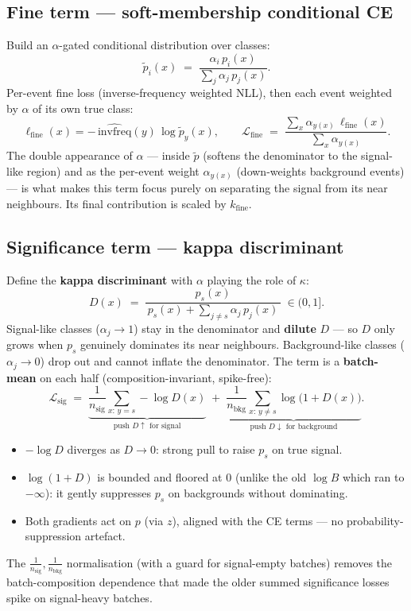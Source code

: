 \documentclass[11pt]{article}
\newcommand{\invfreq}{\widehat{\mathrm{invfreq}}}
\begin{document}
\subsection{Fine term --- soft-membership conditional CE}
Build an $\alpha$-gated conditional distribution over classes:
\begin{equation}
\tilde p_i(x) \;=\; \frac{\alpha_i \, p_i(x)}{\sum_j \alpha_j \, p_j(x)} .
\end{equation}
Per-event fine loss (inverse-frequency weighted NLL), then each event weighted by $\alpha$ of its
own true class:
\begin{equation}
\ell_\text{fine}(x) = -\,\invfreq(y)\,\log \tilde p_y(x),
\qquad
\mathcal{L}_\text{fine} \;=\; \frac{\sum_x \alpha_{y(x)}\,\ell_\text{fine}(x)}{\sum_x \alpha_{y(x)}} .
\end{equation}
The double appearance of $\alpha$ --- inside $\tilde p$ (softens the denominator to the
signal-like region) and as the per-event weight $\alpha_{y(x)}$ (down-weights background events)
--- is what makes this term focus purely on separating the signal from its near neighbours. Its
final contribution is scaled by $k_\text{fine}$.

\subsection{Significance term --- kappa discriminant}
Define the \textbf{kappa discriminant} with $\alpha$ playing the role of $\kappa$:
\begin{equation}
D(x) \;=\; \frac{p_s(x)}{\,p_s(x) + \displaystyle\sum_{j \ne s} \alpha_j \, p_j(x)\,} \;\in (0,1].
\end{equation}
Signal-like classes ($\alpha_j \to 1$) stay in the denominator and \textbf{dilute} $D$ --- so $D$
only grows when $p_s$ genuinely dominates its near neighbours. Background-like classes
($\alpha_j \to 0$) drop out and cannot inflate the denominator. The term is a \textbf{batch-mean}
on each half (composition-invariant, spike-free):
\begin{equation}
\mathcal{L}_\text{sig} \;=\;
\underbrace{\frac{1}{n_\text{sig}} \sum_{x:\,y=s} -\log D(x)}_{\text{push } D \uparrow \text{ for signal}}
\;+\;
\underbrace{\frac{1}{n_\text{bkg}} \sum_{x:\,y\ne s} \log\!\big(1 + D(x)\big)}_{\text{push } D \downarrow \text{ for background}} .
\end{equation}
\begin{itemize}[nosep]
  \item $-\log D$ diverges as $D\to 0$: strong pull to raise $p_s$ on true signal.
  \item $\log(1+D)$ is bounded and floored at $0$ (unlike the old $\log B$ which ran to
        $-\infty$): it gently suppresses $p_s$ on backgrounds without dominating.
  \item Both gradients act on $p$ (via $z$), aligned with the CE terms --- no
        probability-suppression artefact.
\end{itemize}
The $\tfrac{1}{n_\text{sig}}, \tfrac{1}{n_\text{bkg}}$ normalisation (with a guard for
signal-empty batches) removes the batch-composition dependence that made the older summed
significance losses spike on signal-heavy batches.
\end{document}
